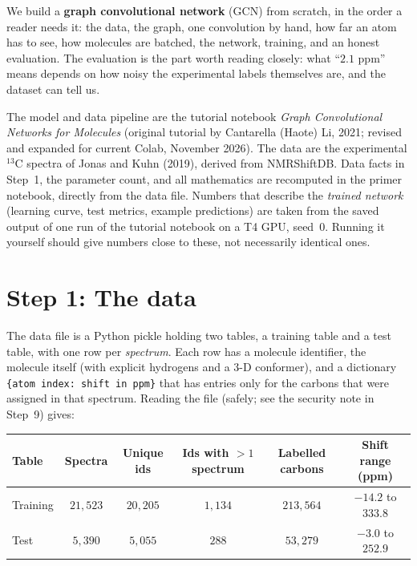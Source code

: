 \documentclass[11pt]{article}
\newcommand{\Cthirteen}{$^{13}$C}
\begin{document}
We build a \textbf{graph convolutional network} (GCN) from scratch, in the order a reader needs it: the data, the graph, one convolution by hand, how far an atom has to see, how molecules are batched, the network, training, and an honest evaluation. The evaluation is the part worth reading closely: what ``$2.1$ ppm'' means depends on how noisy the experimental labels themselves are, and the dataset can tell us.

\begin{keybox}
The model and data pipeline are the tutorial notebook \emph{Graph Convolutional Networks for Molecules} (original tutorial by Cantarella (Haote) Li, 2021; revised and expanded for current Colab, November 2026). The data are the experimental \Cthirteen{} spectra of Jonas and Kuhn (2019), derived from NMRShiftDB. Data facts in Step~1, the parameter count, and all mathematics are recomputed in the primer notebook, directly from the data file. Numbers that describe the \emph{trained network} (learning curve, test metrics, example predictions) are taken from the saved output of one run of the tutorial notebook on a T4 GPU, seed~0. Running it yourself should give numbers close to these, not necessarily identical ones.
\end{keybox}

\section{Step 1: The data}
The data file is a Python pickle holding two tables, a training table and a test table, with one row per \emph{spectrum}. Each row has a molecule identifier, the molecule itself (with explicit hydrogens and a 3-D conformer), and a dictionary \texttt{\{atom index: shift in ppm\}} that has entries only for the carbons that were assigned in that spectrum. Reading the file (safely; see the security note in Step~9) gives:

\begin{center}
\small
\begin{tabular}{@{}lccccc@{}}
\toprule
Table & Spectra & Unique ids & Ids with $>1$ spectrum & Labelled carbons & Shift range (ppm)\\
\midrule
Training & $21{,}523$ & $20{,}205$ & $1{,}134$ & $213{,}564$ & $-14.2$ to $333.8$\\
Test & $5{,}390$ & $5{,}055$ & $288$ & $53{,}279$ & $-3.0$ to $252.9$\\
\bottomrule
\end{tabular}
\end{center}
\end{document}
